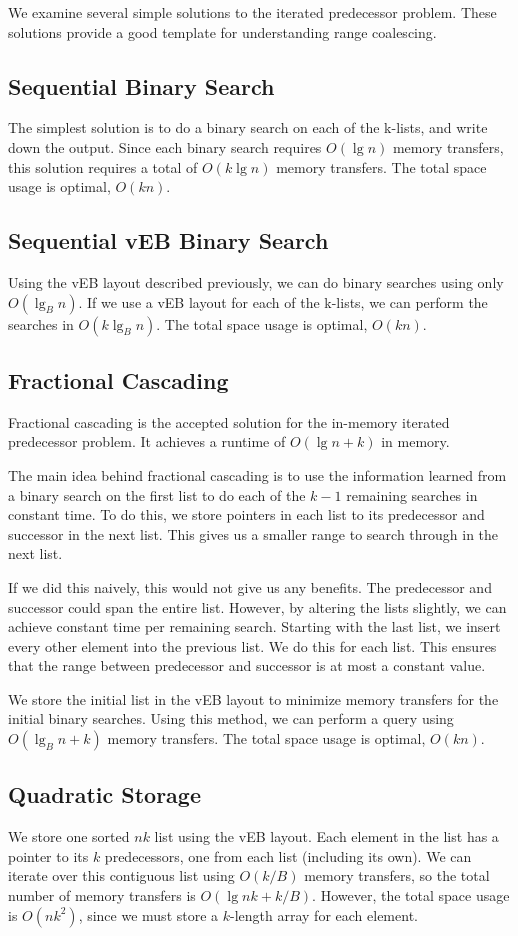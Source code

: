 We examine several simple solutions to the iterated predecessor problem. These solutions provide a good template for understanding range coalescing.

\subsection*{Sequential Binary Search}
The simplest solution is to do a binary search on each of the k-lists, and write down the output. Since each binary search requires $O(\lg n)$ memory transfers, this solution requires a total of $O(k \lg n)$ memory transfers. The total space usage is optimal, $O(kn)$.

\subsection*{Sequential vEB Binary Search}
Using the vEB layout described previously, we can do binary searches using only $O(\lg_B n)$. If we use a vEB layout for each of the k-lists, we can perform the searches in $O(k \lg_B n)$. The total space usage is optimal, $O(kn)$.

\subsection*{Fractional Cascading}
Fractional cascading is the accepted solution for the in-memory iterated predecessor problem. It achieves a runtime of $O(\lg n + k)$ in memory.

The main idea behind fractional cascading is to use the information learned from a binary search on the first list to do each of the $k-1$ remaining searches in constant time. To do this, we store pointers in each list to its predecessor and successor in the next list. This gives us a smaller range to search through in the next list.

If we did this naively, this would not give us any benefits. The predecessor and successor could span the entire list. However, by altering the lists slightly, we can achieve constant time per remaining search. Starting with the last list, we insert every other element into the previous list. We do this for each list. This ensures that the range between predecessor and successor is at most a constant value.

We store the initial list in the vEB layout to minimize memory transfers for the initial binary searches. Using this method, we can perform a query using $O(\lg_B n + k)$ memory transfers. The total space usage is optimal, $O(kn)$.

\subsection*{Quadratic Storage}
We store one sorted $nk$ list using the vEB layout. Each element in the list has a pointer to its $k$ predecessors, one from each list (including its own). We can iterate over this contiguous list using $O(k/B)$ memory transfers, so the total number of memory transfers is $O(\lg nk + k/B)$. However, the total space usage is $O(nk^2)$, since we must store a $k$-length array for each element.



